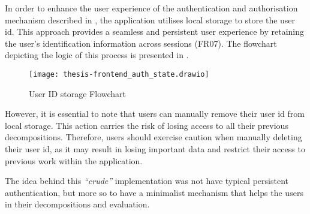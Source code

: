 In order to enhance the user experience of the authentication and authorisation
mechanism described in , the application utilises local
storage to store the user id. This approach provides a seamless and persistent
user experience by retaining the user's identification information across
sessions (FR07). The flowchart depicting the logic of this process is presented
in .

\begin{figure*}[!htb]
  \centering
  \texttt{[image: thesis-frontend\_auth\_state.drawio]}
  \caption{User ID storage Flowchart}
  \label{fig:frontend_auth_state}
\end{figure*}

However, it is essential to note that users can manually remove their user id
from local storage. This action carries the risk of losing access to all their
previous decompositions. Therefore, users should exercise caution when manually
deleting their user id, as it may result in losing important data and restrict
their access to previous work within the application.

The idea behind this \textit{``crude''} implementation was not have typical
persistent authentication, but more so to have a minimalist mechanism that
helps the users in their decompositions and evaluation.
